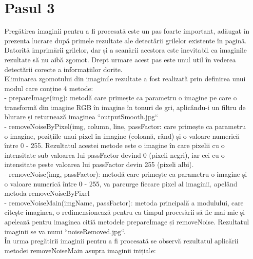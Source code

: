 \documentclass[a4paper,12pt]{report}
\newcommand\tab[1][1cm]{\hspace*{#1}}
\begin{document}
\section{Pasul 3}
\tab Pregătirea imaginii pentru a fi procesată este un pas foarte important, adăugat în prezenta lucrare după primele rezultate ale detectării grilelor existente în pagină. Datorită imprimării grilelor, dar și a scanării acestora este inevitabil ca imaginile 
rezultate să nu aibă zgomot. Drept urmare acest pas este unul util în vederea detectării corecte a informațiilor dorite.
\\ \tab Eliminarea zgomotului din imaginile rezultate a fost realizată prin definirea unui modul care conține 4 metode:
\\ - prepareImage(img): metodă care primește ca parametru o imagine pe care o transformă din imagine RGB în imagine în tonuri de gri, aplicându-i un filtru de blurare și returnează imaginea ``outputSmooth.jpg``
\\ - removeNoiseByPixel(img, column, line, passFactor: care primește ca parametru o imagine, pozițiile unui pixel în imagine (coloană, rând) și o valoare numerică între 0 - 255. Rezultatul acestei metode este o imagine în care pixelii cu o intensitate
sub valoarea lui passFactor devind 0 (pixeli negri), iar cei cu o intensitate peste valoarea lui passFactor devin 255 (pixeli albi).
\\ - removeNoise(img, passFactor):  metodă care primește ca parametru o imagine și o valoare numerică între 0 - 255, va parcurge fiecare pixel al imaginii, apelând metoda removeNoiseByPixel
\\ - removeNoiseMain(imgName, passFactor): metoda principală a modulului, care citește imaginea, o redimensionează pentru ca timpul procesării să fie mai mic și apelează pentru imaginea citiă metodele prepareImage și
removeNoise. Rezultatul imaginii se va numi ``noiseRemoved.jpg``.
\\ \tab În urma pregătirii imaginii pentru a fi procesată se observă rezultatul aplicării metodei removeNoiseMain asupra imaginii inițiale:
\end{document}
